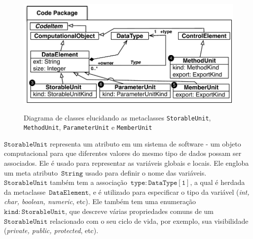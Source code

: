 \begin{figure}[!ht]
	\centering
	\caption{Diagrama de classes elucidando as metaclasses \texttt{StorableUnit}, \texttt{MethodUnit}, \texttt{ParameterUnit} e \texttt{MemberUnit}}
	\includegraphics[scale=0.67]{images/StorableUnit_MethodUnit2}
	\label{fig:StorableUnit_MethodUnit}
\end{figure}





$\mathtt{StorableUnit}$ representa um atributo em um sistema de software - um objeto computacional para que diferentes valores do mesmo tipo de dados possam ser associados. Ele é usado para representar as variáveis globais e locais. Ele engloba um meta atributo~$\mathtt{String}$ usado para definir o nome das variáveis.~$\mathtt{StorableUnit}$ também tem a associação~$\mathtt{type:DataType[1]}$, a qual é herdada da metaclasse~$\mathtt{DataElement}$, e é utilizado para especificar o tipo da variável (\textit{int, char, boolean, numeric}, etc). Ele também tem uma enumeração ~$\mathtt{kind:StorableUnit}$, que descreve várias propriedades comuns de um ~$\mathtt{StorableUnit}$ relacionado com o seu ciclo de vida, por exemplo, sua visibilidade (\textit{private, public, protected}, etc).

